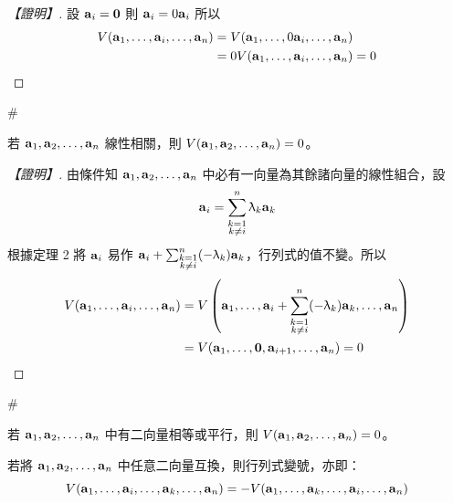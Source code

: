 \begin{proof}[【證明】]
設 $\vect{a}_i = \vect{0}$ 則 $\vect{a}_i = 0\vect{a}_i$ 所以
\begin{align*}
V(\vect{a}_1, \dots, \vect{a}_i, \dots, \vect{a}_n) &= V(\vect{a}_1, \dots, 0\vect{a}_i, \dots, \vect{a}_n) \\
&= 0 V(\vect{a}_1, \dots, \vect{a}_i, \dots, \vect{a}_n) = 0
\end{align*}
\end{proof}\hfill$\#$

\begin{theorem}\label{thm:b6-1-5}
若 $\vect{a}_1, \vect{a}_2, \dots, \vect{a}_n$ 線性相關，則 $V(\vect{a}_1, \vect{a}_2, \dots, \vect{a}_n) = 0$。
\end{theorem}

\begin{proof}[【證明】]
由條件知 $\vect{a}_1, \vect{a}_2, \dots, \vect{a}_n$ 中必有一向量為其餘諸向量的線性組合，設
\begin{equation}
\vect{a}_i = \sum_{\substack{k=1\\ k\ne i}}^n \lambda_k \vect{a}_k \label{eq:b6-1-4-1}
\end{equation}
根據定理 2 將 $\vect{a}_i$ 易作 $\vect{a}_i + \sum_{\substack{k=1\\ k\ne i}}^n (-\lambda_k)\vect{a}_k$，行列式的值不變。所以
\begin{align*}
V(\vect{a}_1, \dots, \vect{a}_i, \dots, \vect{a}_n) &= V\left(\vect{a}_1, \dots, \vect{a}_i + \sum_{\substack{k=1\\ k\ne i}}^n (-\lambda_k)\vect{a}_k, \dots, \vect{a}_n\right) \\
&= V(\vect{a}_1, \dots, \vect{0}, \vect{a}_{i+1}, \dots, \vect{a}_n) = 0
\end{align*}
\end{proof}\hfill$\#$

\begin{corollary}\label{cor:b6-1-1}
若 $\vect{a}_1, \vect{a}_2, \dots, \vect{a}_n$ 中有二向量相等或平行，則 $V(\vect{a}_1, \vect{a}_2, \dots, \vect{a}_n) = 0$。
\end{corollary}

\begin{theorem}\label{thm:b6-1-6}
若將 $\vect{a}_1, \vect{a}_2, \dots, \vect{a}_n$ 中任意二向量互換，則行列式變號，亦即：
\[ V(\vect{a}_1, \dots, \vect{a}_i, \dots, \vect{a}_k, \dots, \vect{a}_n) = -V(\vect{a}_1, \dots, \vect{a}_k, \dots, \vect{a}_i, \dots, \vect{a}_n) \]
\end{theorem}

